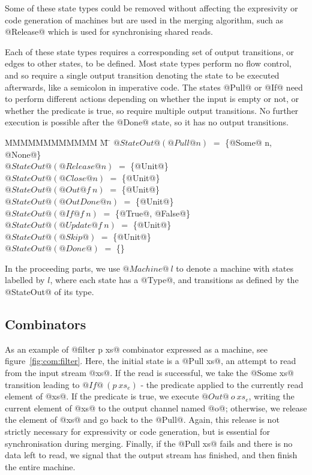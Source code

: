 Some of these state types could be removed without affecting the expresivity or code generation of machines but are used in the merging algorithm, such as @Release@ which is used for synchronising shared reads.

Each of these state types requires a corresponding set of output transitions, or edges to other states, to be defined.
Most state types perform no flow control, and so require a single output transition denoting the state to be executed afterwards, like a semicolon in imperative code.
The states @Pull@ or @If@ need to perform different actions depending on whether the input is empty or not, or whether the predicate is true, so require multiple output transitions.
No further execution is possible after the @Done@ state, so it has no output transitions.
\begin{tabbing}
MMMMMMMMMMMM \= M \= \kill
$@StateOut@(@Pull @n)$
                            \> $=$ \> \{@Some@ n, @None@\} \\
$@StateOut@(@Release @n)$
                            \> $=$ \> \{@Unit@\} \\
$@StateOut@(@Close @n)$
                            \> $=$ \> \{@Unit@\} \\
$@StateOut@(@Out @   f~n)$
                            \> $=$ \> \{@Unit@\} \\
$@StateOut@(@OutDone @ n)$
                            \> $=$ \> \{@Unit@\} \\
$@StateOut@(@If @    f~n)$
                            \> $=$ \> \{@True@, @False@\} \\
$@StateOut@(@Update @f~n)$
                            \> $=$ \> \{@Unit@\} \\
$@StateOut@(@Skip@      )$
                            \> $=$ \> \{@Unit@\} \\
$@StateOut@(@Done@      )$
                            \> $=$ \> \{\} \\
\end{tabbing}

In the proceeding parts, we use $@Machine@~l$ to denote a machine with states labelled by $l$, where each state has a @Type@, and transitions as defined by the @StateOut@ of its type.

\subsection{Combinators}
As an example of @filter p xs@ combinator expressed as a machine, see figure~\ref{fig:com:filter}.
Here, the initial state is a @Pull xs@, an attempt to read from the input stream @xs@.
If the read is successful, we take the @Some xs@ transition leading to $@If@~(p~xs_e)$ - the predicate applied to the currently read element of @xs@.
If the predicate is true, we execute $@Out@~o~xs_e$, writing the current element of @xs@ to the output channel named @o@; otherwise, we release the element of @xs@ and go back to the @Pull@.
Again, this release is not strictly necessary for expressivity or code generation, but is essential for synchronisation during merging.
Finally, if the @Pull xs@ fails and there is no data left to read, we signal that the output stream has finished, and then finish the entire machine.

